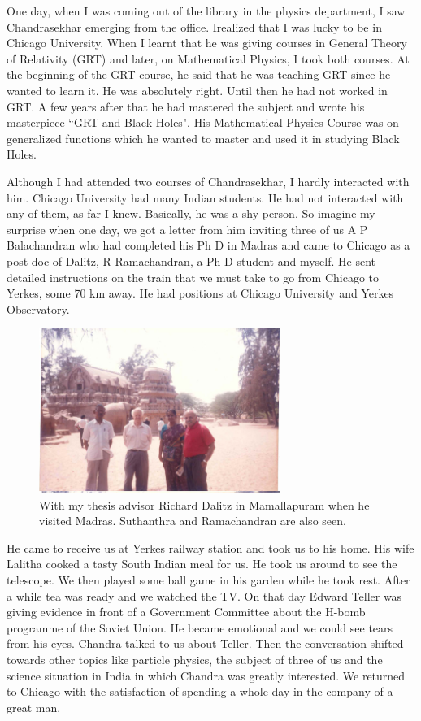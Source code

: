 One day, when I was coming out of the library in the physics department, 
I saw Chandrasekhar emerging from the office. I\break realized that I was 
lucky to be in Chicago University. When I learnt that he was giving 
courses in General Theory of Relativity (GRT) and later, on Mathematical 
Physics, I took both courses. At the beginning of the GRT course, he 
said that he was tea\-ching GRT since he wanted to learn it. He was 
absolutely right. Until\- then he had not worked in GRT. A few years after 
that he had mastered the subject and wrote his masterpiece ``GRT and 
Black Holes". His Mathematical Physics Course was on genera\-lized 
functions which he wanted to master and used it in studying Black Holes.

Although I had attended two courses of Chandrasekhar, I hardly 
interacted with him. Chicago University had many Indian\- students. He had 
not interacted with any of them, as far I knew. Basically, he was a shy 
person. So imagine my surprise when one day, we got a letter from him 
inviting three of us A P Balacha\-ndran who had completed his Ph D in 
Madras and came to Chicago as a post-doc of Dalitz, R Ramachandran, a Ph 
D student and myself. He sent detailed instructions on the train that we 
must take to go from Chicago to Yerkes, some 70 km away. He had 
positions at Chicago University and Yerkes Observatory.

\begin{figure}[H]
\centering
\includegraphics[width=0.7\textwidth]{images/new-images/07-Rajaji-Dalitz.jpg}
\caption{With my thesis advisor Richard Dalitz in Mamalla\-puram when he visited Madras. Suthanthra and Ramachandran are also seen.}
\end{figure}

He came to receive us at Yerkes railway station and took us to his home. 
His wife Lalitha cooked a tasty South Indian meal for us. He took us 
around to see the telescope. We then played some ball game in his garden 
while he took rest. After a while tea was ready and we watched the TV. 
On that day Edward Teller was giving evidence in front of a Government 
Committee about the H-bomb programme of the Soviet Union. He became 
emotional and we could see tears from his eyes. Chandra talked to us 
about Teller. Then the conversation shifted towards other topics like 
particle physics, the subject of three of us and the science situation 
in India in which Chandra was greatly interested. We returned to Chicago 
with the satisfaction of spending a whole day in the company of a great 
man.

